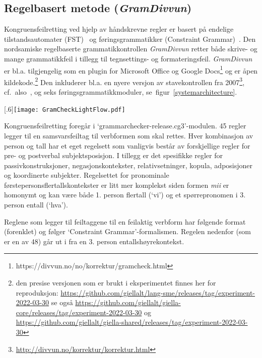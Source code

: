 \documentclass{flammie}
\begin{document}
\subsection{Regelbasert metode (\textit{GramDivvun})}

Kongruensfeilretting ved hjelp av håndskrevne regler er basert på endelige
tilstandsautomater (FST)~\cite{beesley2003finite,Pirinen2014} og
føringsgrammatikker (Constraint Grammar)~\cite{karlsson1990constraint}.  Den
nordsamiske regelbaserte grammatikkontrollen \textit{GramDivvun} retter både
skrive- og mange grammatikkfeil i tillegg til tegnsettings- og formateringsfeil.
\textit{GramDivvun} er bl.a. tilgjengelig som en plugin for Microsoft Office og
Google Docs\footnote{https://divvun.no/no/korrektur/gramcheck.html} og er åpen
kildekode.\footnote{den presise versjonen som er brukt i eksperimentet finnes
her for reproduksjon:
\url{https://github.com/giellalt/lang-sme/releases/tag/experiment-2022-03-30} se
også
\url{https://github.com/giellalt/giella-core/releases/tag/experiment-2022-03-30}
og
\url{https://github.com/giellalt/giella-shared/releases/tag/experiment-2022-03-30}}
Den inkluderer bl.a. en nyere versjon av stavekontrollen fra
2007\footnote{\url{http://divvun.no/korrektur/korrektur.html}}, cf.\
also~\cite{GaupEtAl2005}, og seks føringsgrammatikkmoduler, se\
figur~\ref{systemarchitecture}.

    \begin{figure*}[ht]
    \begin{center}
    \scalebox{.6}[.6]{\texttt{[image: GramCheckLightFlow.pdf]}}
    \caption{Modulær struktur av \textit{GramDivvun}\label{systemarchitecture}}
    \end{center}
    \end{figure*}

Kongruensfeilretting foregår i `grammarchecker-release.cg3'-modulen.  45 regler
legger til en samsvarsfeiltag til verbformen som skal rettes. Hver kombinasjon
av person og tall har et eget regelsett som vanligvis består av forskjellige
regler for pre- og postverbal subjektsposisjon.  I tillegg er det spesifikke
regler for passivkonstruksjoner, negasjonskontekster, relativsetninger, kopula,
adposisjoner og koordinerte subjekter.  Regelsettet for pronominale
førstepersonsflertallskontekster er litt mer komplekst siden formen \textit{mii}
er homonymt og kan være både 1. person flertall (`vi') og et spørrepronomen i 3.
person entall (`hva').

Reglene som legger til feiltaggene til en feilaktig verbform har følgende format
(forenklet) og følger `Constraint Grammar'-formalismen. Regelen nedenfor (som er
en av 48) går ut i fra en 3. person entallshøyrekontekst.
\end{document}
